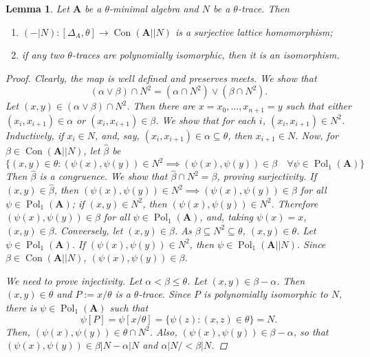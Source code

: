 \documentclass{amsart}
\theoremstyle{plain}
\newtheorem{lemma}[theorem]{Lemma}
\theoremstyle{definition}
\theoremstyle{remark}
\def\A{\forall}
\DeclareMathOperator{\Con}{Con}
\DeclareMathOperator{\Pol}{Pol}
\begin{document}
\begin{lemma}
    \label{lemma_relative}
    Let $\mathbf{A}$ be a $\theta$-minimal algebra and $N$ be a $\theta$-trace. 
    Then 
    \begin{enumerate}
        \item $(-|N): [\Delta_A, \theta] \to \Con(\mathbf{A}||N)$ is a surjective lattice homomorphism; 
        \item if any two $\theta$-traces are polynomially isomorphic, then it is an isomorphism. 
    \end{enumerate}
    \begin{proof}
        Clearly, the map is well defined and preserves meets. 
        We show that 
        \begin{equation*}
            (\alpha \lor \beta) \cap N^2 = (\alpha \cap N^2) \lor (\beta \cap N^2) \text{.}
        \end{equation*}
        Let $(x,y) \in (\alpha \lor \beta) \cap N^2$. 
        Then there are $x=x_0, \ldots, x_{n+1}=y$ such that either $(x_i,x_{i+1}) \in \alpha$ or $(x_i,x_{i+1}) \in \beta$. 
        We show that for each $i$, $(x_i, x_{i+1}) \in N^2$. 
        Inductively, if $x_i \in N$, and, say, $(x_i, x_{i+1}) \in \alpha \subseteq \theta$, then $x_{i+1} \in N$. 
        Now, for $\beta \in \Con(\mathbf{A}||N)$, let $\hat{\beta}$ be
        \begin{equation*}
            \{(x,y) \in \theta : (\psi(x), \psi(y)) \in N^2 \implies (\psi(x), \psi(y)) \in \beta \quad \A \psi \in \Pol_1(\mathbf{A}) \}
        \end{equation*}
        Then $\hat{\beta}$ is a congruence. 
        We show that $\hat{\beta} \cap N^2 =\beta$, proving surjectivity. 
        If $(x,y) \in \hat{\beta}$, then $(\psi(x), \psi(y)) \in N^2 \implies (\psi(x), \psi(y)) \in \beta$ for all $\psi \in \Pol_1(\mathbf{A})$; 
        if $(x,y) \in N^2$, then $(\psi(x), \psi(y)) \in N^2$. 
        Therefore $(\psi(x), \psi(y)) \in \beta$ for all $\psi \in \Pol_1(\mathbf{A})$, and, taking $\psi(x)=x$, $(x,y) \in \beta$. 
        Conversely, let $(x,y) \in \beta$. As $\beta \subseteq N^2 \subseteq \theta$, $(x,y) \in \theta$. 
        Let $\psi \in \Pol_1(\mathbf{A})$. 
        If $(\psi(x), \psi(y)) \in N^2$, then $\psi \in \Pol_1(\mathbf{A}||N)$. 
        Since $\beta \in \Con(\mathbf{A}||N)$, $ (\psi(x), \psi(y)) \in \beta$.  

        We need to prove injectivity. 
        Let $\alpha < \beta \le \theta$. 
        Let $(x,y) \in \beta - \alpha$. 
        Then $(x,y) \in \theta$ and $P:=x/\theta$ is a $\theta$-trace. 
        Since $P$ is polynomially isomorphic to $N$, there is $\psi \in \Pol_1(\mathbf{A})$ such that 
        \begin{equation*}
            \psi[P] = \psi[x/\theta] =\{\psi(z): (x,z) \in \theta\}= N \text{.}
        \end{equation*}
        Then, $(\psi(x),\psi(y)) \in \theta \cap N^2$.
        Also, $(\psi(x),\psi(y)) \in \beta - \alpha$, so that $(\psi(x),\psi(y)) \in \beta|N - \alpha|N$ and $\alpha|N/< \beta|N$. 
    \end{proof}
\end{lemma}
\end{document}
